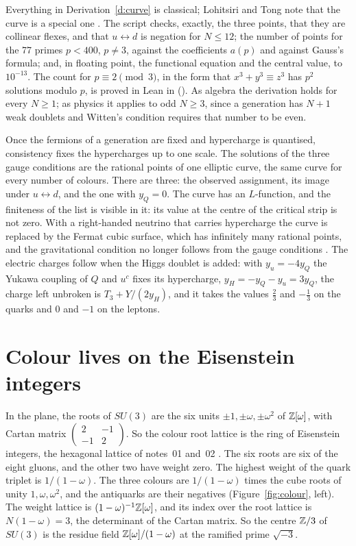 \documentclass[11pt]{article}
\begin{document}
\noindent
Everything in Derivation~\ref{d:curve} is classical; Lohitsiri and Tong note that the curve is a special one \cite{LohitsiriTong}.
The script checks, exactly, the three points, that they are collinear flexes, and that $u\leftrightarrow d$ is negation for $N\le12$; the number of points for the 77 primes $p<400$, $p\ne3$, against the coefficients $a(p)$ and against Gauss's formula; and, in floating point, the functional equation and the central value, to $10^{-13}$.
The count for $p\equiv2\pmod3$, in the form that $x^3+y^3\equiv z^3$ has $p^2$ solutions modulo $p$, is proved in Lean in \formal{} ().
As algebra the derivation holds for every $N\ge1$; as physics it applies to odd $N\ge3$, since a generation has $N+1$ weak doublets and Witten's condition requires that number to be even.

\physical
Once the fermions of a generation are fixed and hypercharge is quantised, consistency fixes the hypercharges up to one scale.
The solutions of the three gauge conditions are the rational points of one elliptic curve, the same curve for every number of colours.
There are three: the observed assignment, its image under $u\leftrightarrow d$, and the one with $y_Q=0$.
The curve has an $L$-function, and the finiteness of the list is visible in it: its value at the centre of the critical strip is not zero.
With a right-handed neutrino that carries hypercharge the curve is replaced by the Fermat cubic surface, which has infinitely many rational points, and the gravitational condition no longer follows from the gauge conditions \cite{LohitsiriTong}.
The electric charges follow when the Higgs doublet is added: with $y_u=-4y_Q$ the Yukawa coupling of $Q$ and $u^c$ fixes its hypercharge, $y_H = -y_Q-y_u = 3y_Q$, the charge left unbroken is $T_3+Y/(2y_H)$, and it takes the values $\frac23$ and $-\frac13$ on the quarks and $0$ and $-1$ on the leptons.

\section{Colour lives on the Eisenstein integers}\label{sec:colour}

In the plane, the roots of $SU(3)$ are the six units $\pm1,\pm\omega,\pm\omega^2$ of $\mathbb{Z}[\omega]$, with Cartan matrix $\left(\begin{smallmatrix}2&-1\\-1&2\end{smallmatrix}\right)$.
So the colour root lattice is the ring of Eisenstein integers, the hexagonal lattice of notes~01 and~02 \cite{ConwaySloane}.
The six roots are six of the eight gluons, and the other two have weight zero.
The highest weight of the quark triplet is $1/(1-\omega)$.
The three colours are $1/(1-\omega)$ times the cube roots of unity $1,\omega,\omega^2$, and the antiquarks are their negatives (Figure~\ref{fig:colour}, left).
The weight lattice is $(1-\omega)^{-1}\mathbb{Z}[\omega]$, and its index over the root lattice is $N(1-\omega) = 3$, the determinant of the Cartan matrix.
So the centre $\mathbb{Z}/3$ of $SU(3)$ is the residue field $\mathbb{Z}[\omega]/(1-\omega)$ at the ramified prime $\sqrt{-3}$.
\end{document}

